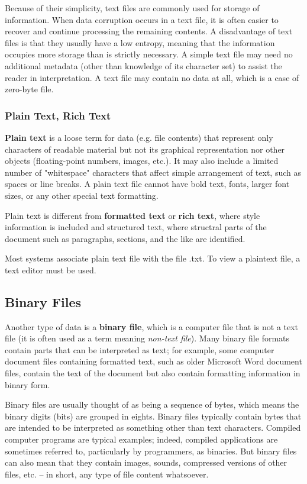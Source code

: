 \documentclass[a4paper, 12pt]{report}
\theoremstyle{remark}
\theoremstyle{definition}
\begin{document}
Because of their simplicity, text files are commonly used for storage of information. When data corruption occurs in a text file, it is often easier to recover and continue processing the remaining contents. A disadvantage of text files is that they usually have a low entropy, meaning that the information occupies more storage than is strictly necessary. A simple text file may need no additional metadata (other than knowledge of its character set) to assist the reader in interpretation. A text file may contain no data at all, which is a case of zero-byte file.

\subsubsection{Plain Text, Rich Text}
\textbf{Plain text} is a loose term for data (e.g. file contents) that represent only characters of readable material but not its graphical representation nor other objects (floating-point numbers, images, etc.). It may also include a limited number of "whitespace" characters that affect simple arrangement of text, such as spaces or line breaks. A plain text file cannot have bold text, fonts, larger font sizes, or any other special text formatting. 

Plain text is different from \textbf{formatted text} or \textbf{rich text}, where style information is included and structured text, where structral parts of the document such as paragraphs, sections, and the like are identified. 

Most systems associate plain text file with the file .txt. To view a plaintext file, a text editor must be used. 

\subsection{Binary Files}
Another type of data is a \textbf{binary file}, which is a computer file that is not a text file (it is often used as a term meaning \textit{non-text file}). Many binary file formats contain parts that can be interpreted as text; for example, some computer document files containing formatted text, such as older Microsoft Word document files, contain the text of the document but also contain formatting information in binary form.

Binary files are usually thought of as being a sequence of bytes, which means the binary digits (bits) are grouped in eights. Binary files typically contain bytes that are intended to be interpreted as something other than text characters. Compiled computer programs are typical examples; indeed, compiled applications are sometimes referred to, particularly by programmers, as binaries. But binary files can also mean that they contain images, sounds, compressed versions of other files, etc. – in short, any type of file content whatsoever.
\end{document}
